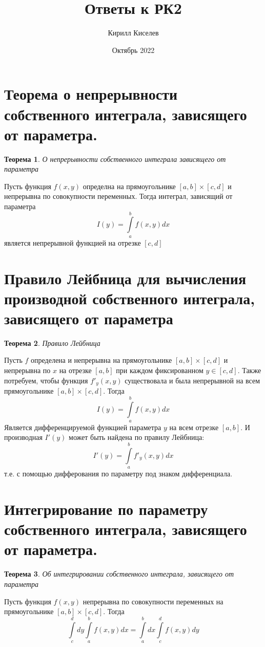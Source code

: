 \documentclass[12pt, a4paper]{article}
\title{Ответы к РК2}
\author{Кирилл Киселев}
\date{Октябрь 2022}
\newtheorem{thm}{Теорема}
\begin{document}
\maketitle
\newpage

\section{Теорема о непрерывности собственного интеграла, зависящего от параметра.}
\begin{thm}
О непрерывности собственного интеграла зависящего от параметра
\end{thm}
Пусть функция $f(x, y)$ определна на прямоугольнике $[a, b] \times [c, d]$ и непрерывна по совокупности переменных.
Тогда интеграл, зависящий от параметра
    \[
        I(y) = \int\limits_a^b f(x, y)dx
    \]
является непрерывной функцией на отрезке $[c, d]$

\section{Правило Лейбница для вычисления производной собственного интеграла, зависящего от параметра}
\begin{thm}
    Правило Лейбница
\end{thm}
Пусть $f$ определена и непрерывна на прямоугольнике $[a, b] \times [c, d]$ и
непрерывна по $x$ на отрезке $[a, b]$ при каждом фиксированном $y \in [c, d]$.
Также потребуем, чтобы функция $f'_y(x, y)$ существовала и была непрерывной на
всем прямоугольнике $[a, b] \times [c, d]$. Тогда
\[
    I(y) = \int\limits_a^b f(x, y)dx
\]
Является дифференцируемой функцией параметра $y$ на всем отрезке $[a, b]$.
И производная $I'(y)$ может быть найдена по правилу Лейбница:
\[
    I'(y) = \int\limits_a^b f'_y(x, y)dx
\]
т.е. с помощью дифферования по параметру под знаком дифференциала.

\section{Интегрирование по параметру собственного интеграла, зависящего от параметра.}
\begin{thm}
    Об интегрировании собственного интеграла, зависящего от параметра
\end{thm}
Пусть функция $f(x, y)$ непрерывна по совокупности переменных на прямоугольнике 
$[a, b] \times [c, d]$. Тогда
\[
    \int\limits_c^d dy \int\limits_a^b f(x, y)dx = \int\limits_a^b dx \int\limits_c^d f(x, y)dy  
    \]
\end{document}
